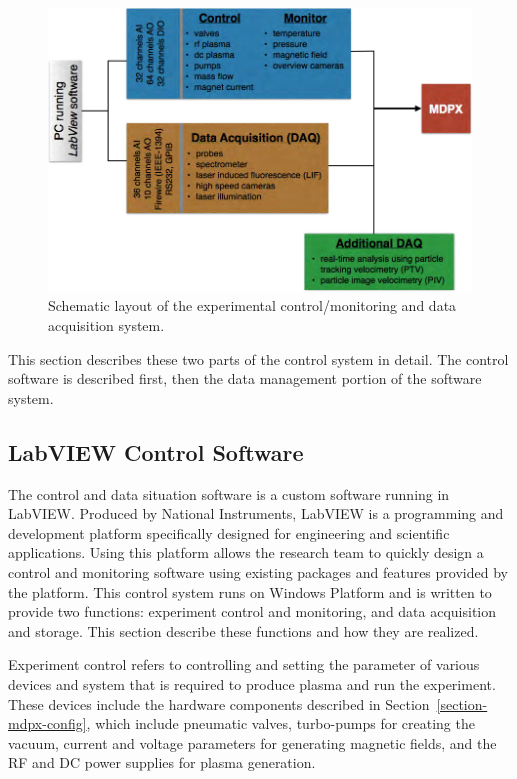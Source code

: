 \begin{figure}[h!]
\begin{center}
\includegraphics[width=6in]{figures/mdpx_software_structure.png}
\caption{Schematic layout of the experimental control/monitoring and data acquisition system. \label{mdpx-software-structure}}
\end{center}
\end{figure}

This section describes these two parts of the control system in detail. The control software is described first, then the data management portion of the software system.


\subsection{LabVIEW Control Software}
The control and data situation software is a custom software running in LabVIEW. Produced by National Instruments, LabVIEW is a programming and development platform specifically designed for engineering and scientific applications. Using this platform allows the research team to quickly design a control and monitoring software using existing packages and features provided by the platform. This control system runs on Windows Platform and is written to provide two functions: experiment control and monitoring, and data acquisition and storage. This section describe these functions and how they are realized.

Experiment control refers to controlling and setting the parameter of various devices and system that is required to produce plasma and run the experiment. These devices include the hardware components described in Section~\ref{section-mdpx-config}, which include pneumatic valves, turbo-pumps for creating the vacuum, current and voltage parameters for generating magnetic fields, and the RF and DC power supplies for plasma generation.

